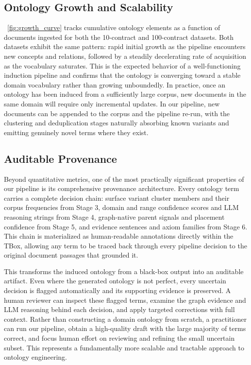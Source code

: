 \documentclass[sigconf]{acmart}
\begin{document}
\subsection{Ontology Growth and Scalability}
~\autoref{fig:growth_curve} tracks cumulative ontology elements as a function of documents ingested for both the 10-contract and 100-contract datasets. Both datasets exhibit the same pattern: rapid initial growth as the pipeline encounters new concepts and relations, followed by a steadily decelerating rate of acquisition as the vocabulary saturates. This is the expected behavior of a well-functioning induction pipeline and confirms that the ontology is converging toward a stable domain vocabulary rather than growing unboundedly. In practice, once an ontology has been induced from a sufficiently large corpus, new documents in the same domain will require only incremental updates. In our pipeline, new documents can be appended to the corpus and the pipeline re-run, with the clustering and deduplication stages naturally absorbing known variants and emitting genuinely novel terms where they exist.


\subsection{Auditable Provenance}
Beyond quantitative metrics, one of the most practically significant properties of our pipeline is its comprehensive provenance architecture. Every ontology term carries a complete decision chain: surface variant cluster members and their corpus frequencies from Stage 3, domain and range confidence scores and LLM reasoning strings from Stage 4, graph-native parent signals and placement confidence from Stage 5, and evidence sentences and axiom families from Stage 6. This chain is materialized as human-readable annotations directly within the TBox, allowing any term to be traced back through every pipeline decision to the original document passages that grounded it.

This transforms the induced ontology from a black-box output into an auditable artifact. Even where the generated ontology is not perfect, every uncertain decision is flagged automatically and its supporting evidence is preserved. A human reviewer can inspect these flagged terms, examine the graph evidence and LLM reasoning behind each decision, and apply targeted corrections with full context. Rather than constructing a domain ontology from scratch, a practitioner can run our pipeline, obtain a high-quality draft with the large majority of terms correct, and focus human effort on reviewing and refining the small uncertain subset. This represents a fundamentally more scalable and tractable approach to ontology engineering.
\end{document}
